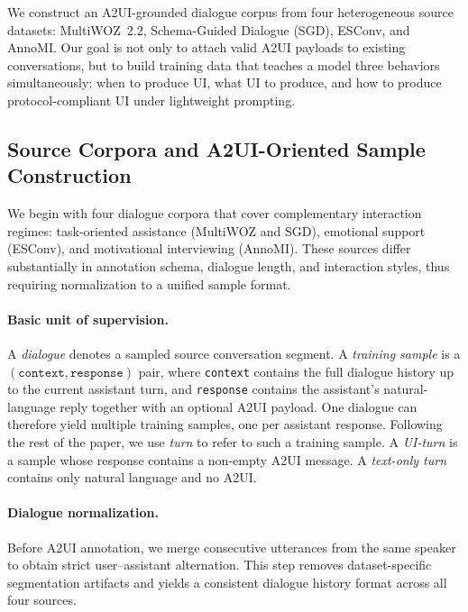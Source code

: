 We construct an A2UI-grounded dialogue corpus from four heterogeneous source datasets: MultiWOZ~2.2, Schema-Guided Dialogue (SGD), ESConv, and AnnoMI. Our goal is not only to attach valid A2UI payloads to existing conversations, but to build training data that teaches a model three behaviors simultaneously: when to produce UI, what UI to produce, and how to produce protocol-compliant UI under lightweight prompting.

\subsection{Source Corpora and A2UI-Oriented Sample Construction}
\label{subsec:data-source}

We begin with four dialogue corpora that cover complementary interaction regimes: task-oriented assistance (MultiWOZ and SGD), emotional support (ESConv), and motivational interviewing (AnnoMI). These sources differ substantially in annotation schema, dialogue length, and interaction styles, thus requiring normalization to a unified sample format.

\paragraph{Basic unit of supervision.}
A \emph{dialogue} denotes a sampled source conversation segment. A \emph{training sample} is a $(\texttt{context}, \texttt{response})$ pair, where \texttt{context} contains the full dialogue history up to the current assistant turn, and \texttt{response} contains the assistant's natural-language reply together with an optional A2UI payload. One dialogue can therefore yield multiple training samples, one per assistant response. Following the rest of the paper, we use \emph{turn} to refer to such a training sample. A \emph{UI-turn} is a sample whose response contains a non-empty A2UI message. A \emph{text-only turn} contains only natural language and no A2UI.

\paragraph{Dialogue normalization.}
Before A2UI annotation, we merge consecutive utterances from the same speaker to obtain strict user--assistant alternation. This step removes dataset-specific segmentation artifacts and yields a consistent dialogue history format across all four sources.

